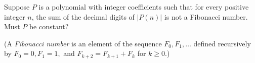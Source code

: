 Suppose $P$ is a polynomial with integer coefficients such that for every positive integer $n$, the sum of the decimal digits of $|P(n)|$ is not a Fibonacci number. Must $P$ be constant?

(A \emph{Fibonacci number} is an element of the sequence $F_0, F_1, \dots$ defined recursively by $F_0=0, F_1=1,$ and $F_{k+2} = F_{k+1}+F_k$ for $k\ge 0$.)